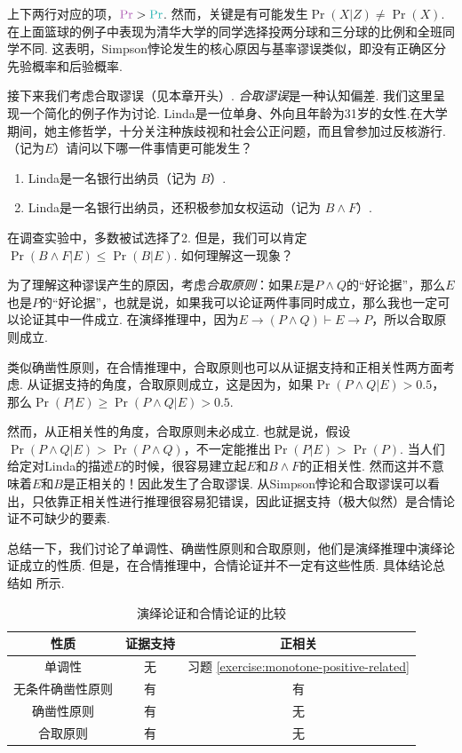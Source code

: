 上下两行对应的项，$\light{\Pr}>\contrastlight{\Pr}$. 然而，关键是有可能发生$\Pr(X|Z) \neq \Pr(X)$. 在上面篮球的例子中表现为清华大学的同学选择投两分球和三分球的比例和全班同学不同. 这表明，Simpson悖论发生的核心原因与基率谬误类似，即没有正确区分先验概率和后验概率.

接下来我们考虑合取谬误（见本章开头）. \textit{合取谬误}是一种认知偏差. 我们这里呈现一个简化的例子作为讨论. Linda是一位单身、外向且年龄为31岁的女性.在大学期间，她主修哲学，十分关注种族歧视和社会公正问题，而且曾参加过反核游行.（记为$E$）请问以下哪一件事情更可能发生？
    \begin{enumerate}
        \item Linda是一名银行出纳员（记为 $B$）.
        \item Linda是一名银行出纳员，还积极参加女权运动（记为 $B\wedge F$）.
    \end{enumerate}
在调查实验中，多数被试选择了2. 但是，我们可以肯定 $\Pr(B \land F|E) \leq \Pr(B|E)$. 如何理解这一现象？

为了理解这种谬误产生的原因，考虑\textit{合取原则}：如果$E$是$P\wedge Q$的“好论据”，那么$E$也是$P$的“好论据”，也就是说，如果我可以论证两件事同时成立，那么我也一定可以论证其中一件成立. 在演绎推理中，因为$E\to(P\wedge Q)\vdash E\to P$，所以合取原则成立. 

类似确凿性原则，在合情推理中，合取原则也可以从证据支持和正相关性两方面考虑. 从证据支持的角度，合取原则成立，这是因为，如果$\Pr(P\wedge Q|E)>0.5$，那么$\Pr(P|E)\geq \Pr(P\wedge Q|E)>0.5$.

然而，从正相关性的角度，合取原则未必成立. 也就是说，假设$\Pr(P\wedge Q|E)>\Pr(P\wedge Q)$，不一定能推出$\Pr(P|E)>\Pr(P)$. 当人们给定对Linda的描述$E$的时候，很容易建立起$E$和$B\wedge F$的正相关性. 然而这并不意味着$E$和$B$是正相关的！因此发生了合取谬误. 从Simpson悖论和合取谬误可以看出，只依靠正相关性进行推理很容易犯错误，因此证据支持（极大似然）是合情论证不可缺少的要素.

总结一下，我们讨论了单调性、确凿性原则和合取原则，他们是演绎推理中演绎论证成立的性质. 但是，在合情推理中，合情论证并不一定有这些性质. 具体结论总结如 所示.

\begin{table}[htbp]
    \centering
    \begin{tabular}{c|c|c}
        \toprule
        性质 & 证据支持 & 正相关 \\ \midrule
        单调性 & 无 & 习题 \ref{exercise:monotone-positive-related} \\
        无条件确凿性原则 & 有 & 有 \\
        确凿性原则 & 有 & 无 \\
        合取原则 & 有 & 无 \\
        \bottomrule
    \end{tabular}
    \caption{演绎论证和合情论证的比较}
    \label{tab:reasoning-comparison}
\end{table}

